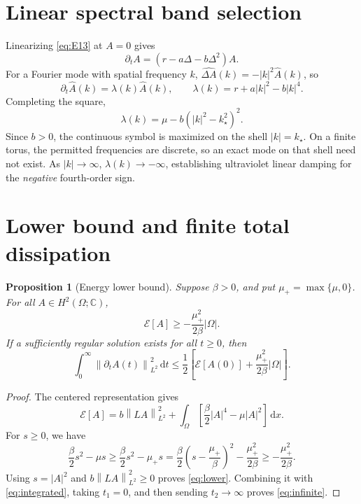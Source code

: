\documentclass[11pt]{article}
\numberwithin{equation}{section}
\newtheorem{proposition}{Proposition}
\newcommand{\E}{\mathcal E}
\newcommand{\Om}{\Omega}
\newcommand{\dd}{\,\mathrm d}
\newcommand{\norm}[1]{\left\lVert #1\right\rVert}
\begin{document}
\section{Linear spectral band selection}

Linearizing \eqref{eq:E13} at $A=0$ gives
\[
\partial_tA=(r-a\Delta-b\Delta^2)A.
\]
For a Fourier mode with spatial frequency $k$,
$\widehat{\Delta A}(k)=-|k|^2\widehat A(k)$, so
\begin{equation}\label{eq:lambda}
\partial_t\widehat A(k)
=\lambda(k)\widehat A(k),\qquad
\lambda(k)=r+a|k|^2-b|k|^4.
\end{equation}
Completing the square,
\begin{equation}\label{eq:bandshell}
\boxed{\displaystyle
\lambda(k)=\mu-b(|k|^2-k_\star^2)^2.}
\end{equation}
Since $b>0$, the continuous symbol is maximized on the
shell $|k|=k_\star$. On a finite torus, the permitted
frequencies are discrete, so an exact mode on that
shell need not exist. As $|k|\to\infty$,
$\lambda(k)\to-\infty$, establishing ultraviolet linear
damping for the \emph{negative} fourth-order sign.

\section{Lower bound and finite total dissipation}

\begin{proposition}[Energy lower bound]
Suppose $\beta>0$, and put $\mu_+=\max\{\mu,0\}$.
For all $A\in H^2(\Om;\mathbb C)$,
\begin{equation}\label{eq:lower}
\boxed{\displaystyle
\E[A]\ge
-\frac{\mu_+^2}{2\beta}|\Om|.}
\end{equation}
If a sufficiently regular solution exists for all $t\ge0$,
then
\begin{equation}\label{eq:infinite}
\boxed{\displaystyle
\int_0^\infty\norm{\partial_tA(t)}_{L^2}^2\dd t
\le\frac12\left[
\E[A(0)]
+\frac{\mu_+^2}{2\beta}|\Om|
\right].}
\end{equation}
\end{proposition}

\begin{proof}
The centered representation gives
\[
\E[A]=b\norm{LA}_{L^2}^2+
\int_\Om\left[
\frac{\beta}{2}|A|^4-\mu|A|^2
\right]\dd x.
\]
For $s\ge0$, we have
\[
\frac{\beta}{2}s^2-\mu s
\ge\frac{\beta}{2}s^2-\mu_+s
=\frac{\beta}{2}
\left(s-\frac{\mu_+}{\beta}\right)^2
-\frac{\mu_+^2}{2\beta}
\ge-\frac{\mu_+^2}{2\beta}.
\]
Using $s=|A|^2$ and $b\norm{LA}_{L^2}^2\ge0$
proves \eqref{eq:lower}. Combining it with
\eqref{eq:integrated}, taking $t_1=0$, and then
sending $t_2\to\infty$ proves \eqref{eq:infinite}.
\end{proof}
\end{document}
